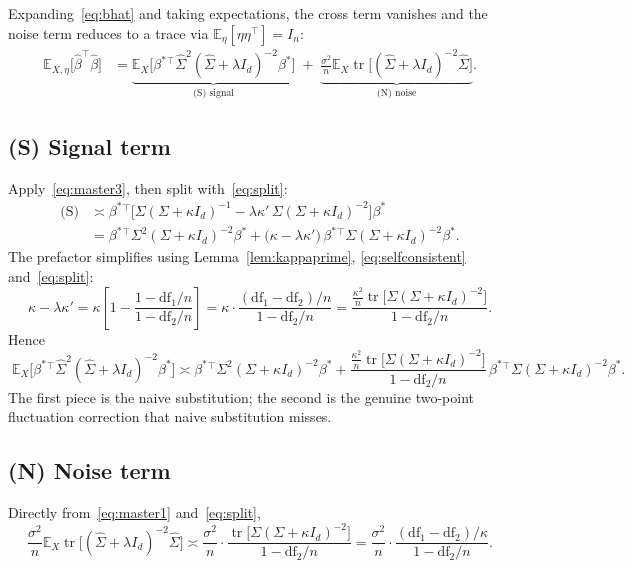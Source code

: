 \documentclass[11pt]{article}
\newcommand{\E}{\mathbb{E}}
\newcommand{\Tr}{\operatorname{tr}}
\newcommand{\Sig}{\Sigma}
\newcommand{\Sighat}{\hat{\Sigma}}
\newcommand{\bstar}{\beta^{*}}
\newcommand{\bhat}{\hat{\beta}}
\newcommand{\Id}{I_{d}}
\newcommand{\dfone}{\mathrm{df}_{1}}
\newcommand{\dftwo}{\mathrm{df}_{2}}
\newcommand{\kap}{\kappa}
\newcommand{\kapp}{\kappa'}
\newcommand{\Sk}{(\Sig+\kap \Id)}
\theoremstyle{plain}
\theoremstyle{remark}
\begin{document}
Expanding~\eqref{eq:bhat} and taking expectations, the cross term vanishes and the noise term
reduces to a trace via $\E_{\eta}[\eta \eta^{\top}] = I_{n}$:
\begin{align}
  \E_{X,\eta}\big[ \bhat^{\top} \bhat \big]
  &= \underbrace{\E_{X}\big[ \bstar{}^{\top} \Sighat^{2} (\Sighat + \lambda \Id)^{-2} \bstar \big]}_{\text{(S) signal}}
  \;+\; \underbrace{\frac{\sigma^{2}}{n} \E_{X} \Tr\!\big[ (\Sighat + \lambda \Id)^{-2} \Sighat \big]}_{\text{(N) noise}}.
\end{align}

\subsection*{(S) Signal term}

Apply~\eqref{eq:master3}, then split with~\eqref{eq:split}:
\begin{align}
  \text{(S)}
  &\asymp \bstar{}^{\top} \Big[ \Sig \Sk^{-1} - \lambda \kapp\, \Sig \Sk^{-2} \Big] \bstar \\
  &= \bstar{}^{\top} \Sig^{2}\Sk^{-2} \bstar
   + \big( \kap - \lambda \kapp \big)\, \bstar{}^{\top} \Sig \Sk^{-2} \bstar .
\end{align}
The prefactor simplifies using Lemma~\ref{lem:kappaprime}, \eqref{eq:selfconsistent} and~\eqref{eq:split}:
\begin{equation}
  \kap - \lambda \kapp
  = \kap \left[ 1 - \frac{1 - \dfone/n}{1 - \dftwo/n} \right]
  = \kap \cdot \frac{(\dfone - \dftwo)/n}{1 - \dftwo/n}
  = \frac{ \tfrac{\kap^{2}}{n} \Tr\!\big[ \Sig \Sk^{-2} \big] }{ 1 - \dftwo/n }.
\end{equation}
Hence
\begin{equation}
  \boxed{\;
  \E_{X}\big[ \bstar{}^{\top} \Sighat^{2}(\Sighat + \lambda \Id)^{-2} \bstar \big]
  \asymp
  \bstar{}^{\top} \Sig^{2} \Sk^{-2} \bstar
  + \frac{ \tfrac{\kap^{2}}{n} \Tr\!\big[ \Sig \Sk^{-2} \big] }{ 1 - \dftwo/n }\,
    \bstar{}^{\top} \Sig \Sk^{-2} \bstar .
  \;}
\end{equation}
The first piece is the naive substitution; the second is the genuine two-point fluctuation
correction that naive substitution misses.

\subsection*{(N) Noise term}

Directly from~\eqref{eq:master1} and~\eqref{eq:split},
\begin{equation}
  \boxed{\;
  \frac{\sigma^{2}}{n} \E_{X}\Tr\!\big[ (\Sighat + \lambda \Id)^{-2} \Sighat \big]
  \asymp
  \frac{\sigma^{2}}{n} \cdot \frac{ \Tr\!\big[ \Sig \Sk^{-2} \big] }{ 1 - \dftwo/n }
  = \frac{\sigma^{2}}{n} \cdot \frac{ (\dfone - \dftwo)/\kap }{ 1 - \dftwo/n }.
  \;}
\end{equation}
\end{document}

